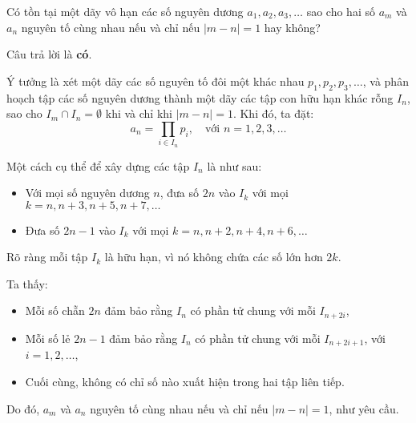 \ifshowproblemandsoln
\ifshowproblem\begin{problem}\label{problem:RMM-2015-P1}\fi
\ifshowsoln\begin{problem}\fi
    Có tồn tại một dãy vô hạn các số nguyên dương \( a_1, a_2, a_3, \ldots \)
    sao cho hai số \( a_m \) và \( a_n \) nguyên tố cùng nhau nếu và chỉ nếu \( |m - n| = 1 \) hay không?
\end{problem}
\fi

\ifshowsoln
\begin{soln}\footnotemark
    Câu trả lời là \textbf{có}.

    Ý tưởng là xét một dãy các số nguyên tố đôi một khác nhau \( p_1, p_2, p_3, \ldots \),
    và phân hoạch tập các số nguyên dương thành một dãy các tập con hữu hạn khác rỗng \( I_n \),
    sao cho \( I_m \cap I_n = \emptyset \) khi và chỉ khi \( |m - n| = 1 \). Khi đó, ta đặt:
    \[
        a_n = \prod_{i \in I_n} p_i, \quad \text{với } n = 1, 2, 3, \ldots
    \]

    Một cách cụ thể để xây dựng các tập \( I_n \) là như sau:
    \begin{itemize}[topsep=0pt, partopsep=0pt, itemsep=0pt]
        \item Với mọi số nguyên dương \( n \), đưa số \( 2n \) vào \( I_k \) với mọi \( k = n, n+3, n+5, n+7, \ldots \)
        \item Đưa số \( 2n - 1 \) vào \( I_k \) với mọi \( k = n, n+2, n+4, n+6, \ldots \)
    \end{itemize}

    Rõ ràng mỗi tập \( I_k \) là hữu hạn, vì nó không chứa các số lớn hơn \( 2k \).

    Ta thấy:
    \begin{itemize}[topsep=0pt, partopsep=0pt, itemsep=0pt]
        \item Mỗi số chẵn \( 2n \) đảm bảo rằng \( I_n \) có phần tử chung với mỗi \( I_{n+2i} \),
        \item Mỗi số lẻ \( 2n - 1 \) đảm bảo rằng \( I_n \) có phần tử chung với mỗi \( I_{n+2i+1} \), với \( i = 1, 2, \ldots \),
        \item Cuối cùng, không có chỉ số nào xuất hiện trong hai tập liên tiếp.
    \end{itemize}

    Do đó, \( a_m \) và \( a_n \) nguyên tố cùng nhau nếu và chỉ nếu \( |m - n| = 1 \), như yêu cầu.
\end{soln}


\end{problem}
